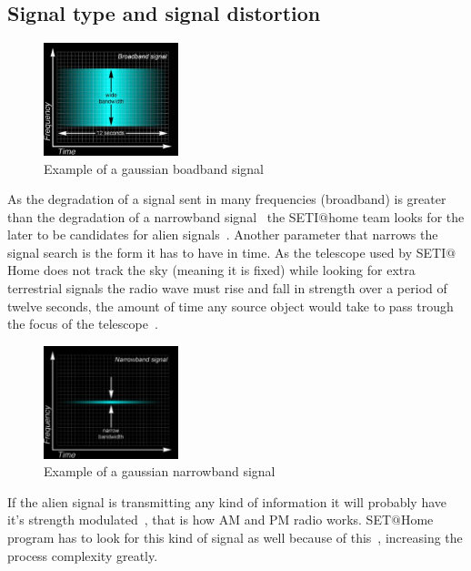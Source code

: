 \subsection{Signal type and signal distortion}\label{hid-sp18-601-subsection-signal}
\begin{figure}[!htb]
        \centering
        \includegraphics[width=0.35\textwidth]{figures/broadband.pdf}
        \caption{Example of a gaussian boadband
        signal~\cite{hid-sp18-601-www-sathome-howworks}}\label{broadbandfigure}
\end{figure}
As the degradation of a signal sent in many frequencies (broadband) is greater 
than the degradation of a narrowband 
signal~\cite{hid-sp18-601-www-sathome-interference} the SETI$@$home team looks
 for the later to be candidates for alien 
 signals~\cite{hid-sp18-601-www-sathome-howworks}. Another parameter that 
 narrows the signal search is the form it has to have in time. As the telescope 
 used by SETI$@$Home does not track the sky (meaning it is fixed) while looking 
 for extra terrestrial signals the radio wave must rise and fall in strength 
 over a period of twelve seconds, the amount of time any source object would 
 take  to pass trough the focus of the 
 telescope~\cite{hid-sp18-601-www-sathome-interference}.

\begin{figure}[!htb]
        \centering
        \includegraphics[width=0.35\textwidth]{figures/narrow.pdf}
        \caption{Example of a gaussian narrowband
        signal~\cite{hid-sp18-601-www-sathome-howworks}}\label{broadbandfigure}
\end{figure}
 
 If the alien signal is transmitting any kind of information it will probably 
 have it's strength modulated~\cite{hid-sp18-601-book-gray1961radio}, that is
 how AM and PM radio works. SET$@$Home program has to look for this kind of 
 signal as well because of 
 this~\cite{hid-sp18-601-www-sathome-howworks}, increasing the process 
 complexity greatly.

